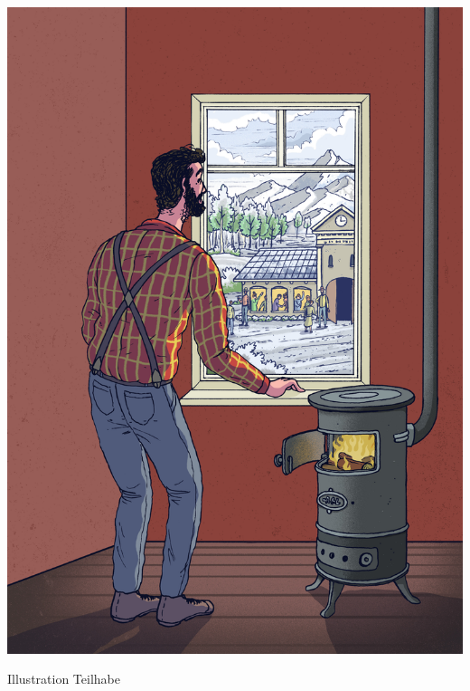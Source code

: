 \documentclass[justified,nobib,symmetric,twoside]{tufte-handout}
\begin{document}
\begin{marginfigure}[6.2cm]
   \includegraphics[width=\linewidth]{figure_13.jpg}
   \caption{Illustration Teilhabe}
   \label{fig:abbildung_13}
\end{marginfigure}
\end{document}
